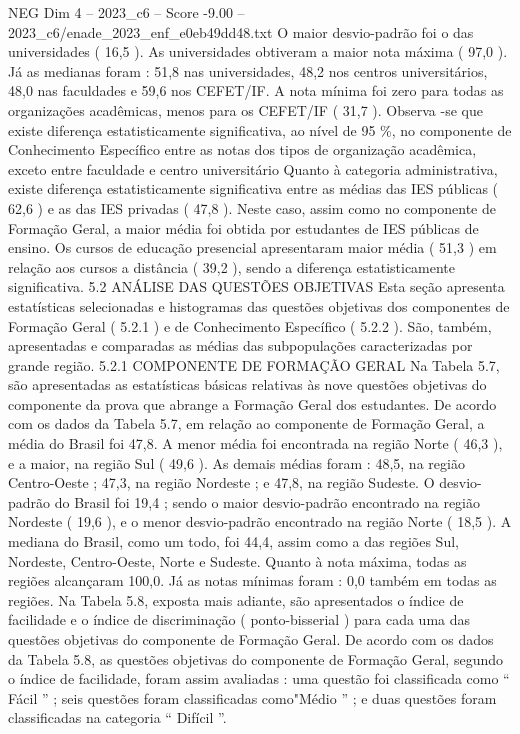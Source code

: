 \begin{textsample}{NEG Dim 4 – 2023\_c6 – Score -9.00 – 2023\_c6/enade\_2023\_enf\_e0eb49dd48.txt}
O maior desvio-padrão foi o das universidades ( 16,5 ).
As universidades obtiveram a maior nota máxima ( 97,0 ).
Já as medianas foram : 51,8 nas universidades, 48,2 nos centros universitários, 48,0 nas faculdades e 59,6 nos CEFET/IF.
A nota mínima foi zero para todas as organizações acadêmicas, menos para os CEFET/IF ( 31,7 ).
Observa -se que existe diferença estatisticamente significativa, ao nível de 95 \%, no componente de Conhecimento Específico entre as notas dos tipos de organização acadêmica, exceto entre faculdade e centro universitário Quanto à categoria administrativa, existe diferença estatisticamente significativa entre as médias das IES públicas ( 62,6 ) e as das IES privadas ( 47,8 ).
Neste caso, assim como no componente de Formação Geral, a maior média foi obtida por estudantes de IES públicas de ensino.
Os cursos de educação presencial apresentaram maior média ( 51,3 ) em relação aos cursos a distância ( 39,2 ), sendo a diferença estatisticamente significativa. 5.2 ANÁLISE DAS QUESTÕES OBJETIVAS Esta seção apresenta estatísticas selecionadas e histogramas das questões objetivas dos componentes de Formação Geral ( 5.2.1 ) e de Conhecimento Específico ( 5.2.2 ).
São, também, apresentadas e comparadas as médias das subpopulações caracterizadas por grande região. 5.2.1 COMPONENTE DE FORMAÇÃO GERAL Na Tabela 5.7, são apresentadas as estatísticas básicas relativas às nove questões objetivas do componente da prova que abrange a Formação Geral dos estudantes.
De acordo com os dados da Tabela 5.7, em relação ao componente de Formação Geral, a média do Brasil foi 47,8.
A menor média foi encontrada na região Norte ( 46,3 ), e a maior, na região Sul ( 49,6 ).
As demais médias foram : 48,5, na região Centro-Oeste ; 47,3, na região Nordeste ; e 47,8, na região Sudeste.
O desvio-padrão do Brasil foi 19,4 ; sendo o maior desvio-padrão encontrado na região Nordeste ( 19,6 ), e o menor desvio-padrão encontrado na região Norte ( 18,5 ).
A mediana do Brasil, como um todo, foi 44,4, assim como a das regiões Sul, Nordeste, Centro-Oeste, Norte e Sudeste.
Quanto à nota máxima, todas as regiões alcançaram 100,0.
Já as notas mínimas foram : 0,0 também em todas as regiões.
Na Tabela 5.8, exposta mais adiante, são apresentados o índice de facilidade e o índice de discriminação ( ponto-bisserial ) para cada uma das questões objetivas do componente de Formação Geral.
De acordo com os dados da Tabela 5.8, as questões objetivas do componente de Formação Geral, segundo o índice de facilidade, foram assim avaliadas : uma questão foi classificada como “ Fácil ” ; seis questões foram classificadas como"Médio ” ; e duas questões foram classificadas na categoria “ Difícil ”.

\end{textsample}
